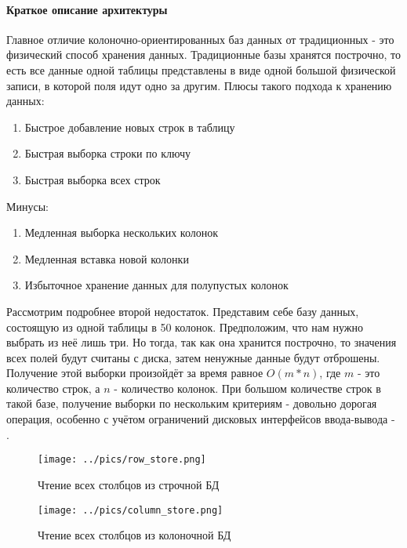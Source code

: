 \documentclass{matmex-diploma}
\begin{document}
        \paragraph{Краткое описание архитектуры}
            Главное отличие колоночно-ориентированных баз данных от традиционных - это физический способ хранения данных. Традиционные базы хранятся построчно, то есть все данные одной таблицы представлены в виде одной большой физической записи, в которой поля идут одно за другим.
        Плюсы такого подхода к хранению данных:
        \begin{enumerate}
            \item Быстрое добавление новых строк в таблицу
            \item Быстрая выборка строки по ключу
            \item Быстрая выборка всех строк
        \end{enumerate}
        Минусы:
        \begin{enumerate}
            \item Медленная выборка нескольких колонок
            \item Медленная вставка новой колонки
            \item Избыточное хранение данных для полупустых колонок
        \end{enumerate}
        
        Рассмотрим подробнее второй недостаток. Представим себе базу данных, состоящую из одной таблицы в 50 колонок. Предположим, что нам нужно выбрать из неё лишь три. Но тогда, так как она хранится построчно, то значения всех полей будут считаны с диска, затем ненужные данные будут отброшены. Получение этой выборки произойдёт за время равное $O(m * n)$, где $m$ - это количество строк, а $n$ - количество колонок. При большом количестве строк в такой базе, получение выборки по нескольким критериям - довольно дорогая операция, особенно с учётом ограничений дисковых интерфейсов ввода-вывода - \cite{habr:column_db}.
        
        \begin{figure}[h]
            \label{row_store}
            \centering
            \texttt{[image: ../pics/row\_store.png]}
            \caption{Чтение всех столбцов из строчной БД}
        \end{figure}
        
        \begin{figure}[h]
            \label{column_store}
            \centering
            \texttt{[image: ../pics/column\_store.png]}
            \caption{Чтение всех столбцов из колоночной БД}
        \end{figure}
        
\end{document}
